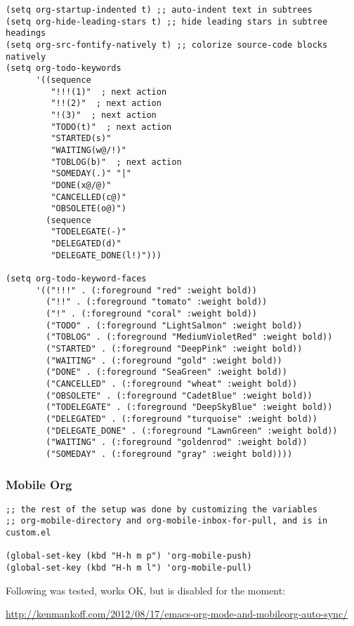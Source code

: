 \documentclass{article}
\begin{document}
\begin{verbatim}
(setq org-startup-indented t) ;; auto-indent text in subtrees
(setq org-hide-leading-stars t) ;; hide leading stars in subtree headings
(setq org-src-fontify-natively t) ;; colorize source-code blocks natively
(setq org-todo-keywords
      '((sequence
         "!!!(1)"  ; next action
         "!!(2)"  ; next action
         "!(3)"  ; next action
         "TODO(t)"  ; next action
         "STARTED(s)"
         "WAITING(w@/!)"
         "TOBLOG(b)"  ; next action
         "SOMEDAY(.)" "|"
         "DONE(x@/@)"
         "CANCELLED(c@)"
         "OBSOLETE(o@)")
        (sequence
         "TODELEGATE(-)"
         "DELEGATED(d)"
         "DELEGATE_DONE(l!)")))

(setq org-todo-keyword-faces
      '(("!!!" . (:foreground "red" :weight bold))
        ("!!" . (:foreground "tomato" :weight bold))
        ("!" . (:foreground "coral" :weight bold))
        ("TODO" . (:foreground "LightSalmon" :weight bold))
        ("TOBLOG" . (:foreground "MediumVioletRed" :weight bold))
        ("STARTED" . (:foreground "DeepPink" :weight bold))
        ("WAITING" . (:foreground "gold" :weight bold))
        ("DONE" . (:foreground "SeaGreen" :weight bold))
        ("CANCELLED" . (:foreground "wheat" :weight bold))
        ("OBSOLETE" . (:foreground "CadetBlue" :weight bold))
        ("TODELEGATE" . (:foreground "DeepSkyBlue" :weight bold))
        ("DELEGATED" . (:foreground "turquoise" :weight bold))
        ("DELEGATE_DONE" . (:foreground "LawnGreen" :weight bold))
        ("WAITING" . (:foreground "goldenrod" :weight bold))
        ("SOMEDAY" . (:foreground "gray" :weight bold))))
\end{verbatim}

\subsubsection{Mobile Org}
\label{sec-2-5-6}

\begin{verbatim}
;; the rest of the setup was done by customizing the variables
;; org-mobile-directory and org-mobile-inbox-for-pull, and is in custom.el

(global-set-key (kbd "H-h m p") 'org-mobile-push)
(global-set-key (kbd "H-h m l") 'org-mobile-pull)
\end{verbatim}

Following was tested, works OK, but is disabled for the moment:

\url{http://kenmankoff.com/2012/08/17/emacs-org-mode-and-mobileorg-auto-sync/}
\end{document}

